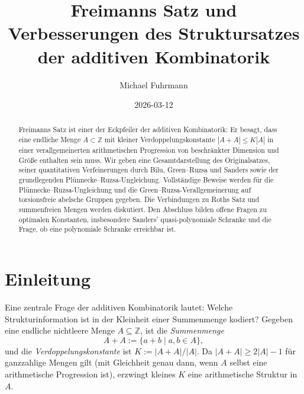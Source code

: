 \documentclass[12pt,a4paper]{amsart}
\theoremstyle{definition}
\theoremstyle{remark}
\newcommand{\Z}{\mathbb{Z}}
\begin{document}
\begin{abstract}
Freimanns Satz ist einer der Eckpfeiler der additiven Kombinatorik: Er besagt,
dass eine endliche Menge $A \subset \Z$ mit kleiner Verdoppelungskonstante
$|A+A| \leq K|A|$ in einer verallgemeinerten arithmetischen Progression von
beschränkter Dimension und Größe enthalten sein muss. Wir geben eine
Gesamtdarstellung des Originalsatzes, seiner quantitativen Verfeinerungen durch
Bilu, Green--Ruzsa und Sanders sowie der grundlegenden Plünnecke--Ruzsa-Ungleichung.
Vollständige Beweise werden für die Plünnecke--Ruzsa-Ungleichung und die
Green--Ruzsa-Verallgemeinerung auf torsionsfreie abelsche Gruppen gegeben.
Die Verbindungen zu Roths Satz und summenfreien Mengen werden diskutiert. Den
Abschluss bilden offene Fragen zu optimalen Konstanten, insbesondere Sanders'
quasi-polynomiale Schranke und die Frage, ob eine polynomiale Schranke erreichbar
ist.
\end{abstract}

\title{Freimanns Satz und Verbesserungen des Struktursatzes\\
der additiven Kombinatorik}

\author{Michael Fuhrmann}
\address{Specialist Mathematics Project, Build 164}
\date{2026-03-12}

\maketitle

\tableofcontents

\section{Einleitung}

Eine zentrale Frage der additiven Kombinatorik lautet: Welche Strukturinformation
ist in der Kleinheit einer Summenmenge kodiert? Gegeben eine endliche nichtleere
Menge $A \subseteq \Z$, ist die \emph{Summenmenge}
\[
  A + A := \{a + b \mid a, b \in A\},
\]
und die \emph{Verdoppelungskonstante} ist $K := |A + A|/|A|$. Da
$|A + A| \geq 2|A| - 1$ für ganzzahlige Mengen gilt (mit Gleichheit genau dann,
wenn $A$ selbst eine arithmetische Progression ist), erzwingt kleines $K$ eine
arithmetische Struktur in $A$.
\end{document}
